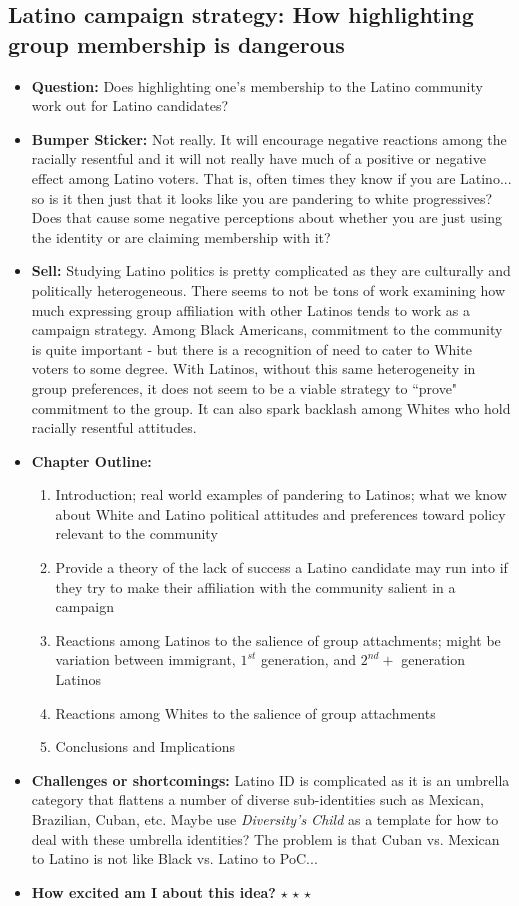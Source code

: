 \documentclass[12pt]{article}
\begin{document}
\subsection{Latino campaign strategy: How highlighting group membership is dangerous}
    \begin{itemize}
        \item \textbf{Question:} Does highlighting one's membership to the Latino community work out for Latino candidates?
        \item \textbf{Bumper Sticker:} Not really. It will encourage negative reactions among the racially resentful and it will not really have much of a positive or negative effect among Latino voters. That is, often times they know if you are Latino... so is it then just that it looks like you are pandering to white progressives? Does that cause some negative perceptions about whether you are just using the identity or are claiming membership with it?
        \item \textbf{Sell:} Studying Latino politics is pretty complicated as they are culturally and politically heterogeneous. There seems to not be tons of work examining how much expressing group affiliation with other Latinos tends to work as a campaign strategy. Among Black Americans, commitment to the community is quite important - but there is a recognition of need to cater to White voters to some degree. With Latinos, without this same heterogeneity in group preferences, it does not seem to be a viable strategy to ``prove" commitment to the group. It can also spark backlash among Whites who hold racially resentful attitudes.
        \item \textbf{Chapter Outline:}
        \begin{enumerate}
            \item Introduction; real world examples of pandering to Latinos; what we know about White and Latino political attitudes and preferences toward policy relevant to the community
            \item Provide a theory of the lack of success a Latino candidate may run into if they try to make their affiliation with the community salient in a campaign
            \item Reactions among Latinos to the salience of group attachments; might be variation between immigrant, $1^{st}$ generation, and $2^{nd} +$ generation Latinos
            \item Reactions among Whites to the salience of group attachments
            \item Conclusions and Implications
        \end{enumerate}
        \item \textbf{Challenges or shortcomings:} Latino ID is complicated as it is an umbrella category that flattens a number of diverse sub-identities such as Mexican, Brazilian, Cuban, etc. Maybe use \textit{Diversity's Child} as a template for how to deal with these umbrella identities? The problem is that Cuban vs. Mexican to Latino is not like Black vs. Latino to PoC...
        \item \textbf{How excited am I about this idea?} $\star$ $\star$ $\star$
    \end{itemize}
\end{document}
